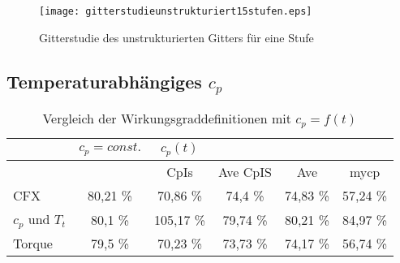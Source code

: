 \begin{figure}[htbp]
	\centering
	\texttt{[image: gitterstudieunstrukturiert15stufen.eps]}
	\caption{Gitterstudie des unstrukturierten Gitters für eine Stufe}
	\label{fig:gitterunstrukturiert15stufen}
\end{figure}

\subsection{Temperaturabhängiges $c_p$}
\begin{table}[H]
	\centering
	\caption{Vergleich der Wirkungsgraddefinitionen mit $c_p = f(t)$}
	\begin{tabular}{ l| c | c c c c}
	&	$c_p = const.$	&	$c_p(t)$	&		&		&		\\
	\hline
	&		&	CpIs	&	Ave CpIS	&	Ave	&	mycp	\\
	\hline
	CFX	&	80,21 \%	&	70,86 \%	&	74,4 \%	&	74,83 \%	&	57,24 \%	\\
	$c_p$ und $T_t$	&	80,1 \%	&	105,17 \%	&	79,74 \%	&	80,21 \%	&	84,97 \%	\\
	Torque	&	79,5 \%	&	70,23 \%	&	73,73 \%	&	74,17 \%	&	56,74 \%	\\
	
	\end{tabular}
	\label{tab:unstrukturiertmycp}
\end{table}